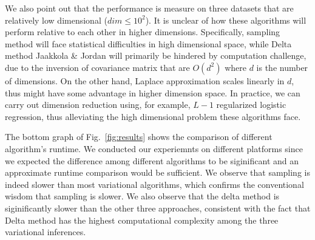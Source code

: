 We also point out that the performance is measure on three datasets that are
relatively low dimensional ($dim \le 10^2$). It is unclear of how these
algorithms will perform relative to each other in higher dimensions.
Specifically, sampling method will face statistical difficulties in high
dimensional space, while Delta method Jaakkola \& Jordan will primarily be
hindered by computation challenge, due to the inversion of covariance matrix
that are $O(d^2)$ where $d$ is the number of dimensions. On the other hand,
Laplace approximation scales linearly in $d$, thus might have some advantage
in higher dimension space. In practice, we can carry out dimension
reduction using, for example, $L-1$ regularized logistic regression, thus
alleviating the high dimensional problem these algorithms face. 

The bottom graph of Fig.~\ref{fig:results} shows the comparison of different
algorithm's runtime. We conducted our experiemnts on different platforms since
we expected the difference among different algorithms to be siginificant and
an approximate runtime comparison would be sufficient. We observe that
sampling is indeed slower than most variational algorithms, which confirms the
conventional wisdom that sampling is slower. We also observe that the delta
method is siginificantly slower than the other three approaches, consistent
with the fact that Delta method has the highest computational complexity among
the three variational inferences.

